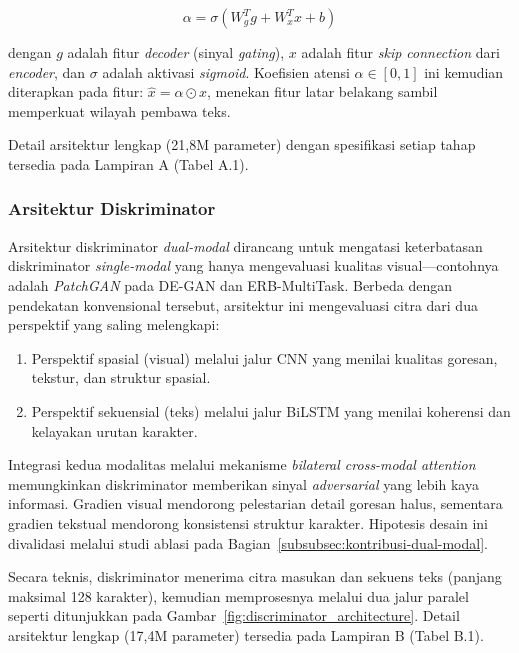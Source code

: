 \begin{equation}
  \alpha = \sigma(W_g^T g + W_x^T x + b)
  \label{eq:IV.1}
\end{equation}

\noindent dengan $g$ adalah fitur \textit{decoder} (sinyal \textit{gating}), $x$ adalah fitur \textit{skip connection} dari \textit{encoder}, dan $\sigma$ adalah aktivasi \textit{sigmoid}. Koefisien atensi $\alpha \in [0,1]$ ini kemudian diterapkan pada fitur: $\hat{x} = \alpha \odot x$, menekan fitur latar belakang sambil memperkuat wilayah pembawa teks.

Detail arsitektur lengkap (21,8M parameter) dengan spesifikasi setiap tahap tersedia pada Lampiran A (Tabel A.1).


\subsubsection{Arsitektur Diskriminator}
\label{subsubsec:diskriminator-dual-modal}

Arsitektur diskriminator \textit{dual-modal} dirancang untuk mengatasi keterbatasan diskriminator \textit{single-modal} yang hanya mengevaluasi kualitas visual---contohnya adalah \textit{PatchGAN} pada DE-GAN dan ERB-MultiTask. Berbeda dengan pendekatan konvensional tersebut, arsitektur ini mengevaluasi citra dari dua perspektif yang saling melengkapi:
\begin{enumerate}[label=(\arabic*), nosep, leftmargin=2em]
  \item Perspektif spasial (visual) melalui jalur CNN yang menilai kualitas goresan, tekstur, dan struktur spasial.
  \item Perspektif sekuensial (teks) melalui jalur BiLSTM yang menilai koherensi dan kelayakan urutan karakter.
\end{enumerate}

\noindent Integrasi kedua modalitas melalui mekanisme \textit{bilateral cross-modal attention} memungkinkan diskriminator memberikan sinyal \textit{adversarial} yang lebih kaya informasi. Gradien visual mendorong pelestarian detail goresan halus, sementara gradien tekstual mendorong konsistensi struktur karakter. Hipotesis desain ini divalidasi melalui studi ablasi pada Bagian~\ref{subsubsec:kontribusi-dual-modal}.

Secara teknis, diskriminator menerima citra masukan dan sekuens teks (panjang maksimal 128 karakter), kemudian memprosesnya melalui dua jalur paralel seperti ditunjukkan pada Gambar~\ref{fig:discriminator_architecture}. Detail arsitektur lengkap (17,4M parameter) tersedia pada Lampiran B (Tabel B.1).


